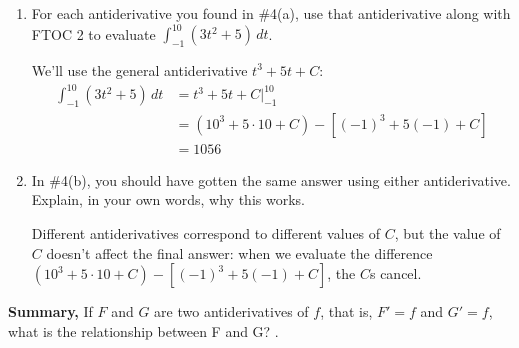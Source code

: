 \documentclass[main]{subfiles}
\begin{document}
\begin{enumerate}[resume]
\begin{enumerate}
  \item
    \begin{problem}[\stretch{0.5}]
      For each antiderivative you found in
      {{{{\#4}}(a)}}, use that antiderivative along
      with FTOC 2 to evaluate $\displaystyle \int_{-1}^{10} (3t^2+5)\,dt$.
    \end{problem}

    \begin{solution}
      We'll use the general antiderivative $t^3 + 5t + C$:
      \begin{align*}
        \int_{-1}^{10} (3t^2 + 5)\,dt &= t^3 + 5t + C \Big|_{-1}^{10} \\
        &= ({10}^3 + 5 \cdot {10} + C) - [(-1)^3 + 5 (-1) + C] \\
        &= \boxed{1056}
      \end{align*}
    \end{solution}

  \item
    \begin{problem}[\stretch{0.75}]
      In {{{{\#4}}(b)}}, you should have gotten
      the same answer using either antiderivative. Explain, in your own
      words, why this works.
    \end{problem}

    \begin{solution}
      Different antiderivatives correspond to different values of $C$, but
      the value of $C$ doesn't affect the final answer: when we evaluate
      the difference $({10}^3 + 5 \cdot {10} + C) - [(-1)^3 + 5 (-1) +
      C]$, the $C$s cancel.
    \end{solution}

  \end{enumerate}
\end{enumerate}

\begin{framed}
    \textbf{Summary,} If $F$ and $G$ are two antiderivatives of $f$, 
    that is, $F'=f$ and $G'=f$, what is the relationship between F and G? 
    .
\end{framed}
\end{document}
